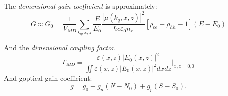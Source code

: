 The \textit{demensional gain coefficient} is approximately:
\begin{equation}
	G \approx G_0 = \frac{1}{V_{MD}} \sum_{k_q, x, z} \frac{E}{E_0} \frac{|\mu(k_q, x, z)|^2}{\hbar c \varepsilon_0 n_r}[\rho_{ee} + \rho_{hh} - 1] (E - E_0)
\end{equation}

And the \textit{dimensional coupling factor}.
\begin{equation}
	\Gamma_{MD} = \frac{\varepsilon(x,z) |E_0(x,z)|^2}{\iint \varepsilon(x,z) |E_0(x,z)|^2 dx d z}\bigg|_{x,z=0,0}
\end{equation}
And goptical gain coefficient:
\begin{equation}
	g = g_0 + g_n(N-N_0) + g_p(S - S_0).
\end{equation}